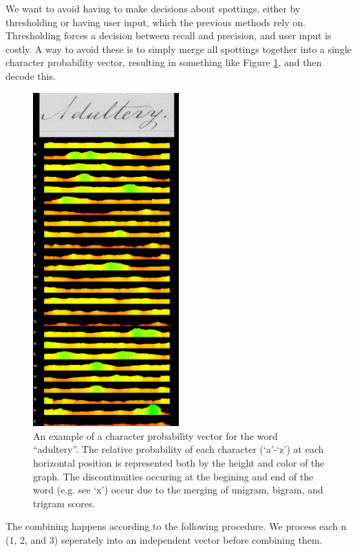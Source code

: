 \documentclass[ms,electronic,twosidetoc,letterpaper,chaptercenter,parttop,lof,lot]{byumsphd}
\begin{document}
We want to avoid having to make decisions about spottings, either by thresholding or having user input, which the previous methods rely on. Thresholding forces a decision between recall and precision, and user input is costly. A way to avoid these is to simply merge all spottings together into a single character probability vector, resulting in something like Figure \ref{fig:cpv}, and then decode this.

\begin{figure}
    \centering
    \includegraphics[width=0.5\textwidth]{cpv}
    \caption{An example of a character probability vector for the word ``adultery''. The relative probability of each character (`a'-`z') at each horizontal position is represented both by the height and color of the graph. The discontinuities occuring at the begining and end of the word (e.g. see `x') occur due to the merging of unigram, bigram, and trigram scores.}
    \label{fig:cpv}
\end{figure}

The combining happens according to the following procedure.
We process each n (1, 2, and 3) seperately into an independent vector before combining them.
\end{document}
